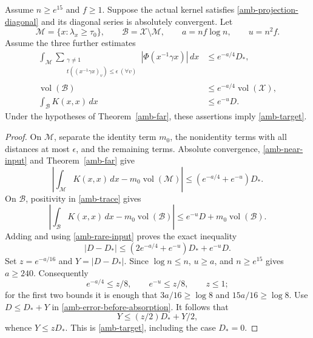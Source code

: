 \begin{proposition}\label{amb-final-reduction}
Assume $n\ge e^{15}$ and $f\ge1$. Suppose the actual kernel
satisfies \eqref{amb-projection-diagonal} and its diagonal
series is absolutely convergent. Let
\[
 \mathcal M=\{x:\lambda_x\ge\tau_0\},\qquad
 \mathcal B=\mathcal X\setminus\mathcal M,
 \qquad a=nf\log n,\qquad u=n^2f.
\]
Assume the three further estimates
\begin{align}
 \int_{\mathcal M}
   \sum_{\substack{\gamma\ne1\\
          t((x^{-1}\gamma x)_v)\le\epsilon\ (\forall v)}}
                      |\Phi(x^{-1}\gamma x)|\,dx
                  &\le e^{-a/4}D_*,                    \label{amb-near-input}\\
 \operatorname{vol}(\mathcal B)
                  &\le e^{-a/4}\operatorname{vol}(\mathcal X),
                                                        \label{amb-rare-input}\\
 \int_{\mathcal B}K(x,x)\,dx&\le e^{-u}D.             \label{amb-deep-input}
\end{align}
Under the hypotheses of Theorem~\ref{amb-far}, these assertions
imply \eqref{amb-target}.
\end{proposition}
\begin{proof}
On $\mathcal M$, separate the identity term $m_0$, the nonidentity
terms with all distances at most $\epsilon$, and the remaining
terms. Absolute convergence, \eqref{amb-near-input} and
Theorem~\ref{amb-far} give
\[
 \left|\int_{\mathcal M}K(x,x)\,dx
                      -m_0\operatorname{vol}(\mathcal M)\right|
                  \le(e^{-a/4}+e^{-u})D_*.
\]
On $\mathcal B$, positivity in \eqref{amb-trace} gives
\[
 \left|\int_{\mathcal B}K(x,x)\,dx
                      -m_0\operatorname{vol}(\mathcal B)\right|
 \le e^{-u}D+m_0\operatorname{vol}(\mathcal B).
\]
Adding and using \eqref{amb-rare-input} proves the exact inequality
\begin{equation}\label{amb-error-before-absorption}
             |D-D_*|\le(2e^{-a/4}+e^{-u})D_*+e^{-u}D.
\end{equation}
Set $z=e^{-a/16}$ and $Y=|D-D_*|$. Since $\log n\le n$,
$u\ge a$, and $n\ge e^{15}$ gives $a\ge240$.
Consequently
\[
        e^{-a/4}\le z/8,\qquad e^{-u}\le z/8,\qquad z\le1;
\]
for the first two bounds it is enough that
$3a/16\ge\log8$ and $15a/16\ge\log8$.
Use $D\le D_*+Y$ in \eqref{amb-error-before-absorption}.
It follows that
\[
                    Y\le(z/2)D_*+Y/2,
\]
whence $Y\le zD_*$. This is \eqref{amb-target}, including the
case $D_*=0$.
\end{proof}

